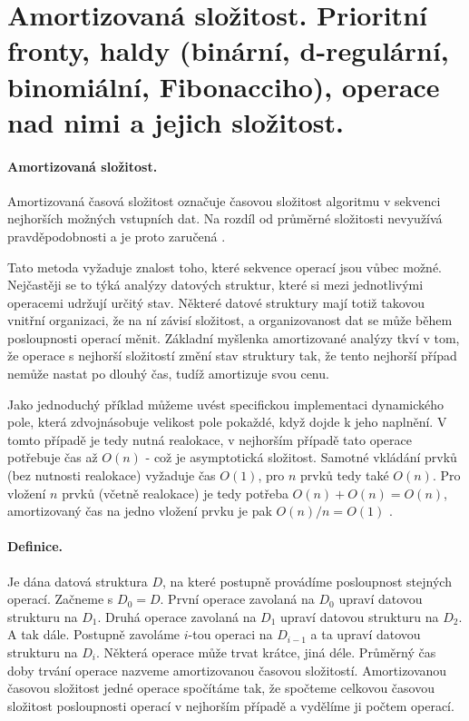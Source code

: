 \section[PAL - Složitost, fronty, haldy]{Amortizovaná složitost. Prioritní fronty, haldy (binární, d-regulární, binomiální, Fibonacciho), operace nad nimi a jejich složitost.}

\paragraph{Amortizovaná složitost.} Amortizovaná časová složitost označuje časovou složitost algoritmu v sekvenci nejhorších možných vstupních dat. Na rozdíl od průměrné složitosti nevyužívá pravděpodobnosti a je proto zaručená \cite{algoritmy:amortizovanaslozitost}.

Tato metoda vyžaduje znalost toho, které sekvence operací jsou vůbec možné. Nejčastěji se to týká analýzy datových struktur, které si mezi jednotlivými operacemi udržují určitý stav. Některé datové struktury mají totiž takovou vnitřní organizaci, že na ní závisí složitost, a organizovanost dat se může během posloupnosti operací měnit. Základní myšlenka amortizované analýzy tkví v tom, že operace s nejhorší složitostí změní stav struktury tak, že tento nejhorší případ nemůže nastat po dlouhý čas, tudíž amortizuje svou cenu.

Jako jednoduchý příklad můžeme uvést specifickou implementaci dynamického pole, která zdvojnásobuje velikost pole pokaždé, když dojde k jeho naplnění. V tomto případě je tedy nutná realokace, v nejhorším případě tato operace potřebuje čas až $O(n)$ - což je asymptotická složitost. Samotné vkládání prvků (bez nutnosti realokace) vyžaduje čas $O(1)$, pro $n$ prvků tedy také $O(n)$. Pro vložení $n$ prvků (včetně realokace) je tedy potřeba $O(n) + O(n) = O(n)$, amortizovaný čas na jedno vložení prvku je pak $O(n)/n = O(1)$ \cite{wiki:amortizovana}.

\paragraph{Definice.} Je dána datová struktura $D$, na které postupně provádíme posloupnost stejných operací. Začneme s $D_0 = D$. První operace zavolaná na $D_0$ upraví datovou strukturu na $D_1$. Druhá operace zavolaná na $D_1$ upraví datovou strukturu na $D_2$. A tak dále. Postupně zavoláme $i$-tou operaci na $D_{i-1}$ a ta upraví datovou strukturu na $D_i$. Některá operace může trvat krátce, jiná déle. Průměrný čas doby trvání operace nazveme amortizovanou časovou složitostí. Amortizovanou časovou složitost jedné operace spočítáme tak, že spočteme celkovou časovou složitost posloupnosti operací v nejhorším případě a vydělíme ji počtem operací.

